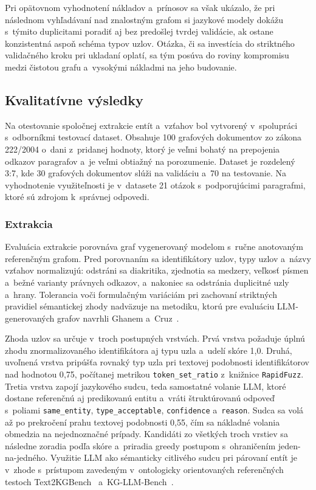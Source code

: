 Pri opätovnom vyhodnotení nákladov a~prínosov sa však ukázalo, že pri následnom vyhľadávaní nad znalostným grafom si jazykové modely dokážu s~týmito duplicitami poradiť aj bez predošlej tvrdej validácie, ak ostane konzistentná aspoň schéma typov uzlov. Otázka, či sa investícia do striktného validačného kroku pri ukladaní oplatí, sa tým posúva do roviny kompromisu medzi čistotou grafu a~vysokými nákladmi na jeho budovanie.



\subsection{Kvalitatívne výsledky}
Na otestovanie spoločnej extrakcie entít a~vzťahov bol vytvorený v~spolupráci s~odborníkmi testovací dataset. Obsahuje 100 grafových dokumentov zo zákona 222/2004 o~dani z~pridanej hodnoty, ktorý je veľmi bohatý na prepojenia odkazov paragrafov a~je veľmi obtiažný na porozumenie. Dataset je rozdelený 3:7, kde 30 grafových dokumentov slúži na validáciu a~70 na testovanie. Na vyhodnotenie využiteľnosti je v~datasete 21 otázok s~podporujúcimi paragrafmi, ktoré sú zdrojom k~správnej odpovedi.


\subsubsection{Extrakcia}
Evaluácia extrakcie porovnáva graf vygenerovaný modelom s~ručne anotovaným referenčným grafom. Pred porovnaním sa identifikátory uzlov, typy uzlov a~názvy vzťahov normalizujú: odstráni sa diakritika, zjednotia sa medzery, veľkosť písmen a~bežné varianty právnych odkazov, a~nakoniec sa odstránia duplicitné uzly a~hrany. Tolerancia voči formulačným variáciám pri zachovaní striktných pravidiel sémantickej zhody nadväzuje na metodiku, ktorú pre evaluáciu LLM-generovaných grafov navrhli Ghanem a~Cruz~\cite{ghanem2025kgeval}.

Zhoda uzlov sa určuje v~troch postupných vrstvách. Prvá vrstva požaduje úplnú zhodu znormalizovaného identifikátora aj typu uzla a~udelí skóre 1{,}0. Druhá, uvoľnená vrstva pripúšťa rovnaký typ uzla pri textovej podobnosti identifikátorov nad hodnotou 0{,}75, počítanej metrikou \texttt{token\_set\_ratio} z~knižnice \texttt{RapidFuzz}. Tretia vrstva zapojí jazykového sudcu, teda samostatné volanie LLM, ktoré dostane referenčnú aj predikovanú entitu a~vráti štruktúrovanú odpoveď s~poliami \texttt{same\_entity}, \texttt{type\_acceptable}, \texttt{confidence} a~\texttt{reason}. Sudca sa volá až po prekročení prahu textovej podobnosti 0{,}55, čím sa nákladné volania obmedzia na nejednoznačné prípady. Kandidáti zo všetkých troch vrstiev sa následne zoradia podľa skóre a~priradia greedy postupom s~ohraničením jeden-na-jedného. Využitie LLM ako sémanticky citlivého sudcu pri párovaní entít je v~zhode s~prístupom zavedeným v~ontologicky orientovaných referenčných testoch Text2KGBench~\cite{mihindukulasooriya2023text2kgbench} a~KG-LLM-Bench~\cite{markowitz2025kgllmbench}.


